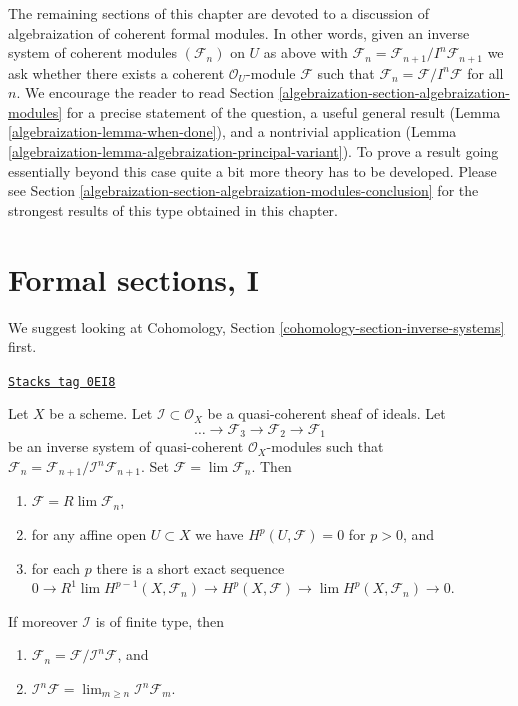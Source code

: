 \medskip\noindent
The remaining sections of this chapter are devoted to a discussion
of algebraization of coherent formal modules. In other words, given
an inverse system of coherent modules $(\mathcal{F}_n)$ on $U$
as above with
$\mathcal{F}_n = \mathcal{F}_{n + 1}/I^n\mathcal{F}_{n + 1}$
we ask whether there exists a coherent $\mathcal{O}_U$-module
$\mathcal{F}$ such that
$\mathcal{F}_n = \mathcal{F}/I^n\mathcal{F}$
for all $n$. We encourage the reader to read
Section \ref{algebraization-section-algebraization-modules}
for a precise statement of the question, a useful general result
(Lemma \ref{algebraization-lemma-when-done}), and a nontrivial application
(Lemma \ref{algebraization-lemma-algebraization-principal-variant}).
To prove a result going essentially beyond this case
quite a bit more theory has to be developed.
Please see Section \ref{algebraization-section-algebraization-modules-conclusion}
for the strongest results of this type obtained in this chapter.

\section{Formal sections, I}
\label{algebraization-section-ML-degree-zero}
We suggest looking at
Cohomology, Section \ref{cohomology-section-inverse-systems} first.

\begin{lemma}
\label{algebraization-lemma-properties-system}
\href{https://stacks.math.columbia.edu/tag/0EI8}{\texttt{Stacks tag 0EI8}}

Let $X$ be a scheme. Let $\mathcal{I} \subset \mathcal{O}_X$
be a quasi-coherent sheaf of ideals. Let
$$
\ldots \to \mathcal{F}_3 \to \mathcal{F}_2 \to \mathcal{F}_1
$$
be an inverse system of quasi-coherent $\mathcal{O}_X$-modules
such that
$\mathcal{F}_n = \mathcal{F}_{n + 1}/\mathcal{I}^n\mathcal{F}_{n + 1}$.
Set $\mathcal{F} = \lim \mathcal{F}_n$. Then
\begin{enumerate}
\item $\mathcal{F} = R\lim \mathcal{F}_n$,
\item for any affine open $U \subset X$ we have
$H^p(U, \mathcal{F}) = 0$ for $p > 0$, and
\item for each $p$ there is a short exact sequence
$0 \to R^1\lim H^{p - 1}(X, \mathcal{F}_n) \to
H^p(X, \mathcal{F}) \to \lim H^p(X, \mathcal{F}_n) \to 0$.
\end{enumerate}
If moreover $\mathcal{I}$ is of finite type, then
\begin{enumerate}
\item[(4)]
$\mathcal{F}_n = \mathcal{F}/\mathcal{I}^n\mathcal{F}$, and
\item[(5)]
$\mathcal{I}^n \mathcal{F} = \lim_{m \geq n} \mathcal{I}^n\mathcal{F}_m$.
\end{enumerate}
\end{lemma}

